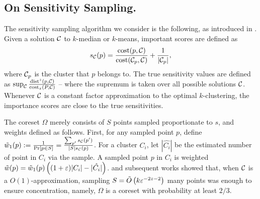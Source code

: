 \subsection{On Sensitivity Sampling.}
\label{ssec:sens_sampling}
The sensitivity sampling algorithm we consider is the following, as introduced in \cite{FeldmanL11}.
Given a solution $\mathcal C$ to $k$-median or $k$-means, important scores are defined as
\begin{equation}
\label{eq:sensitivity}
 s_\mathcal C(p) = \dfrac{\operatorname{cost}(p, \mathcal C)}{\operatorname{cost}(\mathcal C_{p}, \mathcal C)} + \dfrac{1}{|\mathcal C_p|},
\end{equation}
where $\mathcal C_p$ is the cluster that $p$ belongs to. The true sensitivity values are defined as $\sup_{\mathcal C} \frac{\operatorname{dist}^z(p, \mathcal C)}{\operatorname{cost}_z(P, \mathcal C)}$ -- where the supremum is taken over all possible solutions $\mathcal C$.
Whenever $\mathcal C$ is a constant factor approximation to the optimal $k$-clustering, the importance scores are close to the true sensitivities. 

The coreset $\Omega$ merely consists of $S$ points sampled proportionate to $s$, and weights defined as follows. First, for any sampled point $p$, define $\tilde w_1(p) := \frac{1}{\Pr[p \in S]} = \frac{\sum_{p'} s_\mathcal C(p')}{|S| s_\mathcal C(p)}$. For a cluster $C_i$, let $|\hat{C_i}|$ be the estimated number of point in $C_i$ via the sample. A sampled point $p$ in $C_i$ is weighted $\tilde w(p) = \tilde w_1(p) \left( (1+\varepsilon)|C_i| - |\hat{C_i}|\right)$.
%
\cite{FeldmanL11} and subsequent works showed that, when $\mathcal C$ is a $O(1)$-approximation, sampling $S = \tilde O\left( k \varepsilon^{-2z-2}\right)$ many points was enough to ensure concentration, namely, $\Omega$ is a coreset with probability at least $2/3$.

